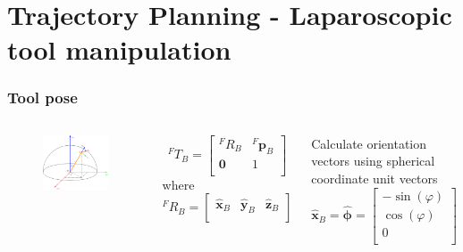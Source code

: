 \section{Trajectory Planning - Laparoscopic tool manipulation}

\begin{frame}
\frametitle{Tool pose}

\begin{columns}
\begin{center}
\begin{figure}[!htb]
\centering
\includegraphics[width=\textwidth]{../images/fulcrum-space.png}\\
\end{figure}
\end{center}
\[
{}^{F}T_B = \begin{bmatrix}
{}^{F}R_B & {}^{F}\mathbf{p}^{}_B \\
\mathbf{0} & 1 \\
\end{bmatrix}
\]
where
\[
{}^{F}R_B = \begin{bmatrix}
\hat{\mathbf{x}}^{}_B & \hat{\mathbf{y}}^{}_B & \hat{\mathbf{z}}^{}_B \\
\end{bmatrix}
\]

Calculate orientation vectors using spherical coordinate unit vectors
\[
\hat{\mathbf{x}}^{}_B = \hat{\mathbf{\phi}}
= \begin{bmatrix}
-\sin(φ) \\
\cos(φ) \\
0 \\
\end{bmatrix}
\]


\end{columns}
\end{frame}
